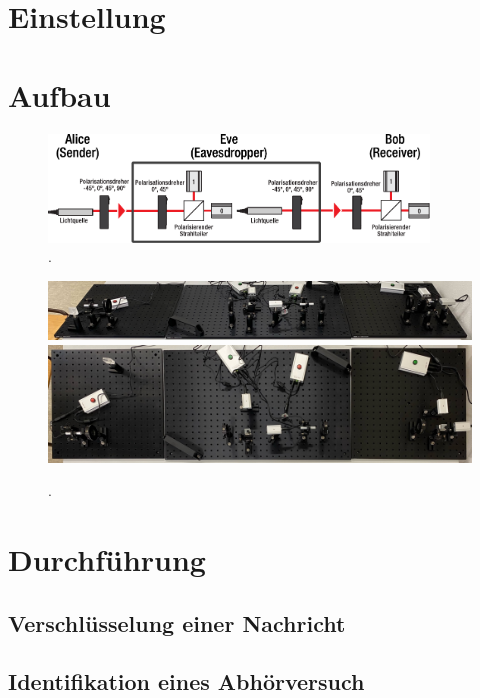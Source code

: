 \newpage

\cite{krypt}

\section{Einstellung}

\section{Aufbau}

\begin{figure}[H]
	\centering
	\includegraphics[width=0.9\textwidth]{content/aufbau/schema.pdf}
	\caption{.}
	\label{fig:schema}
\end{figure}

\begin{figure}[H]
	\centering
	\includegraphics[width=1.0\textwidth]{content/aufbau/front.jpg}\\[1ex]
	\includegraphics[width=1.0\textwidth]{content/aufbau/drauf.jpg}
	\caption{.}
	\label{fig:aufbau}
\end{figure}

\section{Durchführung}

\subsection{Verschlüsselung einer Nachricht}

\subsection{Identifikation eines Abhörversuch}
